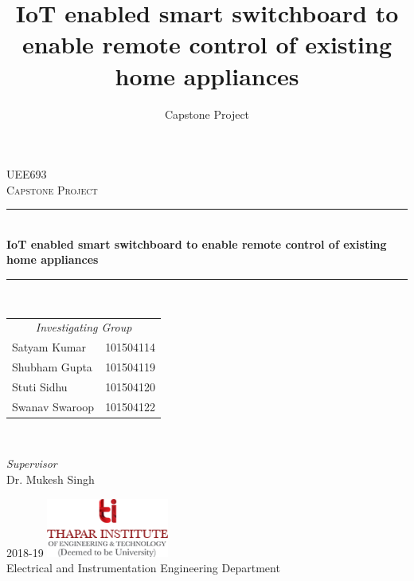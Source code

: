 \documentclass[12pt,a4paper,titlepage, oneside]{book}
\title{ IoT enabled smart switchboard to enable remote control of existing home appliances }
\author{Capstone Project}
\begin{document}
    \begin{titlepage} 
    	\newcommand{\HRule}{\rule{\linewidth}{0.4mm}}
    	\centering 
    	\textsc{\Large UEE693}\\[0.5cm] 
    	\textsc{\large Capstone Project}\\[0.5cm]
    	\HRule\\[0.4cm]
    	{\huge\bfseries IoT enabled smart switchboard to enable remote control of existing home appliances}\\[0.4cm]
    	\HRule\\[1.5cm]
    	\vfill
    	\begin{minipage}{0.5\textwidth}
    		\begin{flushleft}
    			\large
    			\begin{tabular}{l l}
    				\multicolumn{2}{c}{\textit{Investigating Group}} \\
    				Satyam Kumar   & 101504114 \\
    				Shubham Gupta  & 101504119 \\
    				Stuti Sidhu    & 101504120 \\
    				Swanav Swaroop & 101504122 \\
    			\end{tabular}
    			
    		\end{flushleft}
    	\end{minipage}
    	~
    	\begin{minipage}{0.4\textwidth}
    		\begin{flushright}
    			\large
    			\textit{Supervisor}\\
    			Dr. Mukesh Singh
    		\end{flushright}
    	\end{minipage}
    	\vfill\vfill\vfill
    	{\large 2018-19}		
    	\vfill\vfill
    	\includegraphics[width=0.3\textwidth]{logo.png}\\
    	Electrical and Instrumentation Engineering Department\\
    \end{titlepage}
    
    \setcounter{tocdepth}{1}
    \tableofcontents
    \newpage
    \frontmatter
	    
	    
	    
	    
	    
	    \newpage
	    
        
    \mainmatter
	    
	    
	    
	    
	    
	             
  
    \backmatter
    	
    	
    	
\end{document}
